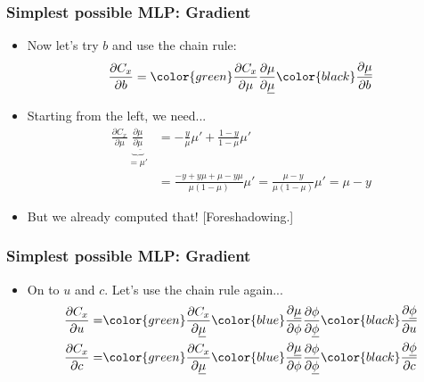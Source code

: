 \documentclass{beamer}
\begin{document}
\begin{frame}
\frametitle{Simplest possible MLP: Gradient}


\begin{itemize}
\item Now let's try $b$ and use the chain rule:
\begin{align*}
    \frac{\partial C_x}{\partial b} = \color{green}\frac{\partial C_x}{\partial \mu}
    \frac{\partial \mu}{\partial \underline{\mu}}\color{black}
    \frac{\partial \underline{\mu}}{\partial b}
\end{align*}
\item Starting from the left, we need...
\begin{align*}
    \frac{\partial C_x}{\partial \mu} \underbrace{\frac{\partial \mu}{\partial
    \underline{\mu}}}_{=\mu'} & = 
    -\frac{y}{\mu}\mu' +
    \frac{1-y}{1-\mu}\mu'\\ 
   & = \frac{-y + y\mu + \mu - y\mu }{\mu(1-\mu)}\mu' 
    = \frac{\mu - y}{\mu(1-\mu)}\mu' 
    = \mu - y
\end{align*}
\item But we already computed that! [Foreshadowing.]
\end{itemize}

\end{frame}

\begin{frame}
\frametitle{Simplest possible MLP: Gradient}

\begin{itemize}
\item On to $u$ and $c$. Let's use the chain rule again...
\begin{align*}
    \frac{\partial C_x}{\partial u} =& \color{green} \frac{\partial C_x}{\partial
    \underline{\mu}}
    \color{blue} \frac{\partial \underline{\mu}}{\partial \phi}
    \frac{\partial \phi}{\partial \underline{\phi}}
    \color{black} \frac{\partial \underline{\phi}}{\partial u} \\
    \frac{\partial C_x}{\partial c} =& \color{green}\frac{\partial C_x}{\partial
    \underline{\mu}}
    \color{blue} \frac{\partial \underline{\mu}}{\partial \phi}
     \frac{\partial \phi}{\partial \underline{\phi}}
    \color{black} \frac{\partial \underline{\phi}}{\partial c}
\end{align*}
\end{itemize}

\end{frame}
\end{document}
